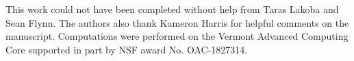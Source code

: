 This work could not have been completed without help from Taras Lakoba and Sean Flynn.
The authors also thank Kameron Harris for helpful comments on the manuscript.
Computations were performed on the Vermont Advanced Computing Core supported in part by NSF award No. OAC-1827314.
